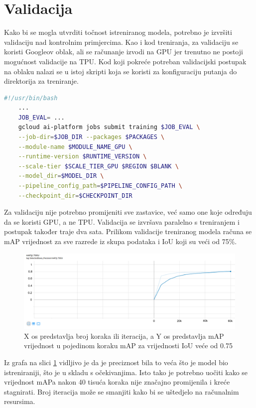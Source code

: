 \section{Validacija}
Kako bi se mogla utvrditi točnost istreniranog modela, potrebno je izvršiti validaciju nad kontrolnim primjercima. Kao i kod treniranja, za validaciju se koristi Googleov oblak, ali se računanje izvodi
na GPU jer trenutno ne postoji mogućnost validacije na TPU. Kod koji pokreće potreban validacijski postupak na oblaku nalazi se u istoj skripti koja se koristi za konfiguraciju putanja do direktorija za treniranje.

\begin{lstlisting}[language=bash, tabsize=2]
    #!/usr/bin/bash
    ...
    JOB_EVAL= ...
    gcloud ai-platform jobs submit training $JOB_EVAL \
    --job-dir=$JOB_DIR --packages $PACKAGES \
    --module-name $MODULE_NAME_GPU \
    --runtime-version $RUNTIME_VERSION \
    --scale-tier $SCALE_TIER_GPU $REGION $BLANK \
    --model_dir=$MODEL_DIR \
    --pipeline_config_path=$PIPELINE_CONFIG_PATH \
    --checkpoint_dir=$CHECKPOINT_DIR
\end{lstlisting}

Za validaciju nije potrebno promijeniti sve zastavice, već samo one koje određuju da se koristi GPU, a ne TPU. Validacija se izvršava paralelno s treniranjem i postupak također traje dva sata.
Prilikom validacije treniranog modela računa se mAP vrijednost za sve razrede iz skupa podataka i IoU koji su veći od 75\%. \newline

\begin{figure}[htb]
    \centering
    \includegraphics[width=14cm]{img/eval-mAP.png}
    \caption{X os predstavlja broj koraka ili iteracija, a Y os predstavlja mAP vrijednost u pojedinom koraku mAP za vrijednosti IoU veće od 0.75}
    \label{Eval-mAP}
\end{figure}

Iz grafa na slici \ref{Eval-mAP} vidljivo je da je preciznost bila to veća što je model bio istreniraniji, što je u skladu s očekivanjima. Isto tako je potrebno uočiti 
kako se vrijednost mAPa nakon 40 tisuća koraka nije značajno promijenila i kreće stagnirati. Broj iteracija može se smanjiti kako bi se uštedjelo na računalnim resursima.  

